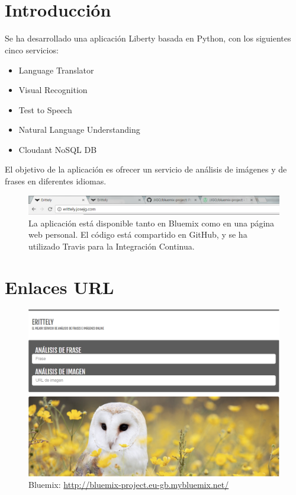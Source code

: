 \documentclass[a4paper]{article}
\title{\HWTitle \\ \vspace{.25cm}}
\date{\HWDueDate}
\author{\HWAuthorName}
\begin{document}
\maketitle
\pagestyle{fancy}
\vfill
\vfill\vfill
\newpage
\section{Introducción} %
\label{sec:introducción}
  Se ha desarrollado una aplicación Liberty basada en Python, con los siguientes cinco servicios:
  \begin{itemize}
    \item Language Translator
    \item Visual Recognition
    \item Test to Speech
    \item Natural Language Understanding
    \item Cloudant NoSQL DB
  \end{itemize}
  El objetivo de la aplicación es ofrecer un servicio de análisis de imágenes y de frases en diferentes idiomas.
\begin{figure}[htp!]
    \centering
    \caption{La aplicación está disponible tanto en Bluemix como en una página web personal. El código está compartido en GitHub, y se ha utilizado Travis para la Integración Continua.}
    \label{fig:webs}
    \includegraphics[width=\textwidth]{webs1}
\end{figure}
\section{Enlaces URL} %
\label{sec:enlaces_url}


\begin{figure}[htp!]
    \centering
    \caption{Bluemix: \url{http://bluemix-project.eu-gb.mybluemix.net/}}
    \label{fig:blue}
    \includegraphics[width=\textwidth]{blue}
\end{figure}
\end{document}
